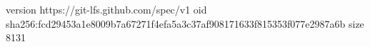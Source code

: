 version https://git-lfs.github.com/spec/v1
oid sha256:fcd29453a1e8009b7a67271f4efa5a3c37af908171633f815353f077e2987a6b
size 8131
